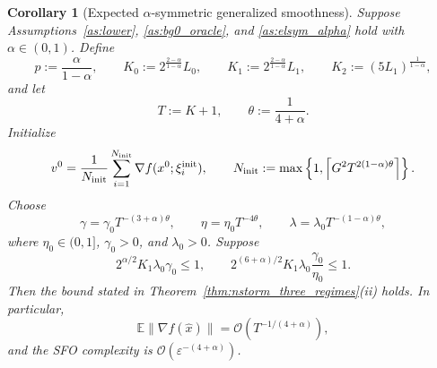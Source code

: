 \documentclass[letter,11pt]{article}
\newtheorem{corollary}{Corollary}[theorem]
\newcommand{\E}{\mathbb{E}}
\newcommand{\Ocal}{\mathcal{O}}
\begin{document}
\begin{corollary}[Expected \(\alpha\)-symmetric generalized smoothness]
\label{cor:app_nstorm_alpha}
Suppose Assumptions~\ref{as:lower}, \ref{as:bg0_oracle}, and
\ref{as:elsym_alpha} hold with \(\alpha\in(0,1)\). Define
\[
    p:=\frac{\alpha}{1-\alpha},
    \qquad
    K_0:=2^{\frac{2-\alpha}{1-\alpha}}L_0,
    \qquad
    K_1:=2^{\frac{2-\alpha}{1-\alpha}}L_1,
    \qquad
    K_2:=(5L_1)^{\frac1{1-\alpha}},
\]
and let
\[
    T:=K+1,
    \qquad
    \theta:=\frac{1}{4+\alpha}.
\]
Initialize
\[
    v^0
    =
    \frac1{N_{\rm init}}
    \sum_{i=1}^{N_{\rm init}}\nabla f(x^0;\xi_i^{\rm init}),
    \qquad
    N_{\rm init}
    :=
    \max\left\{
        1,\left\lceil G^2T^{2(1-\alpha)\theta}\right\rceil
    \right\}.
\]
Choose
\[
    \gamma=\gamma_0T^{-(3+\alpha)\theta},
    \qquad
    \eta=\eta_0T^{-4\theta},
    \qquad
    \lambda=\lambda_0T^{-(1-\alpha)\theta},
\]
where \(\eta_0\in(0,1]\), \(\gamma_0>0\), and \(\lambda_0>0\). Suppose
\[
    2^{\alpha/2}K_1\lambda_0\gamma_0\le1,
    \qquad
    2^{(6+\alpha)/2}K_1\lambda_0\frac{\gamma_0}{\eta_0}\le1.
\]
Then the bound stated in Theorem~\ref{thm:nstorm_three_regimes}(ii) holds.
In particular,
\[
    \E\|\nabla f(\widehat x)\|
    =
    \Ocal(T^{-1/(4+\alpha)}),
\]
and the SFO complexity is \(\Ocal(\varepsilon^{-(4+\alpha)})\).
\end{corollary}
\end{document}
